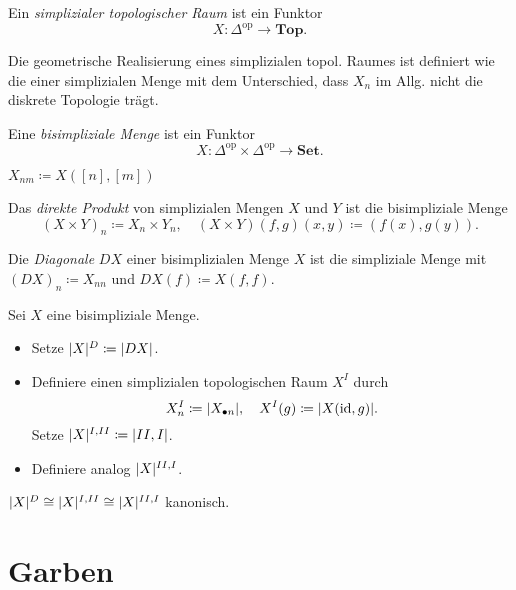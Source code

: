 \documentclass{cheat-sheet}
\newcommand{\SetC}{\mathbf{Set}} %
\newcommand{\Top}{\mathbf{Top}} %
\newcommand{\op}{\mathrm{op}} %
\begin{document}

\begin{defn}
  Ein \emph{simplizialer topologischer Raum} ist ein Funktor
  \[ X : \Delta^\op \to \Top. \]
\end{defn}

\begin{bem}
  Die geometrische Realisierung eines simplizialen topol. Raumes ist definiert wie die einer simplizialen Menge mit dem Unterschied, dass $X_n$ im Allg. nicht die diskrete Topologie trägt.
\end{bem}

\begin{defn}
  Eine \emph{bisimpliziale Menge} ist ein Funktor
  \[ X : \Delta^\op \times \Delta^\op \to \SetC. \]
\end{defn}

\begin{nota}
  $X_{nm} \coloneqq X([n],[m])$
\end{nota}

\begin{bsp}
  Das \emph{direkte Produkt} von simplizialen Mengen $X$ und $Y$ ist die bisimpliziale Menge
  \[
    (X \times Y)_n \coloneqq X_n \times Y_n, \quad
    (X \times Y)(f, g)(x, y) \coloneqq (f(x), g(y)).
  \]
\end{bsp}

\begin{samepage}

\begin{defn}
  Die \emph{Diagonale} $DX$ einer bisimplizialen Menge $X$ ist die simpliziale Menge mit
  $(DX)_n \coloneqq X_{nn}$ und $DX(f) \coloneqq X(f, f)$.
\end{defn}

\begin{defn}
  Sei $X$ eine bisimpliziale Menge.
  \begin{itemize}
    \item Setze $\lvert X\rvert^D \coloneqq \lvert DX\rvert$.
    \item Definiere einen simplizialen topologischen Raum $X^I$ durch
    \[ X^I_n \coloneqq \lvert X_{\bullet n}\rvert, \quad X^I(g) \coloneqq \lvert X(\mathrm{id}, g)\rvert. \]
    Setze $\lvert X\rvert^{I,II} \coloneqq \lvert II,I\rvert$.
    \item Definiere analog $\lvert X\rvert^{II,I}$.
  \end{itemize}
\end{defn}

\begin{satz}
  $\lvert X\rvert^D \cong \lvert X\rvert^{I,II} \cong \lvert X\rvert^{II,I}$ kanonisch.
\end{satz}

\section{Garben}

\end{samepage}
\end{document}
